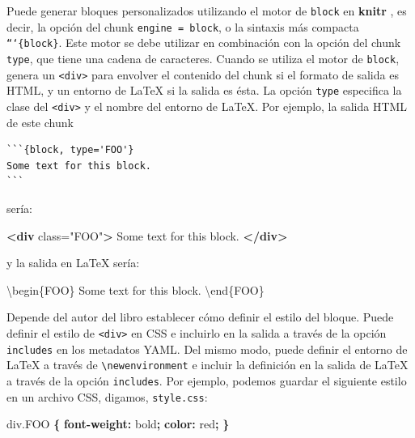 \documentclass[12pt,]{krantz}
\makeatletter
\newenvironment{Shaded}{\begin{snugshade}}{\end{snugshade}}
\newcommand{\KeywordTok}[1]{\textcolor[rgb]{0.13,0.29,0.53}{\textbf{{#1}}}}
\newcommand{\DataTypeTok}[1]{\textcolor[rgb]{0.13,0.29,0.53}{{#1}}}
\newcommand{\FloatTok}[1]{\textcolor[rgb]{0.00,0.00,0.81}{{#1}}}
\newcommand{\StringTok}[1]{\textcolor[rgb]{0.31,0.60,0.02}{{#1}}}
\newcommand{\OtherTok}[1]{\textcolor[rgb]{0.56,0.35,0.01}{{#1}}}
\newcommand{\NormalTok}[1]{{#1}}
\newenvironment{kframe}{%
\medskip{}
\setlength{\fboxsep}{.8em}
 \def\at@end@of@kframe{}%
 \ifinner\ifhmode%
  \def\at@end@of@kframe{\end{minipage}}%
  \begin{minipage}{\columnwidth}%
 \fi\fi%
 \def\FrameCommand##1{\hskip\@totalleftmargin \hskip-\fboxsep
 \colorbox{shadecolor}{##1}\hskip-\fboxsep
     \hskip-\linewidth \hskip-\@totalleftmargin \hskip\columnwidth}%
 \MakeFramed {\advance\hsize-\width
   \@totalleftmargin\z@ \linewidth\hsize
   \@setminipage}}%
 {\par\unskip\endMakeFramed%
 \at@end@of@kframe}
\renewenvironment{Shaded}{\begin{kframe}}{\end{kframe}}
\theoremstyle{definition}
\theoremstyle{definition}
\theoremstyle{remark}
\makeatother
\begin{document}
Puede generar bloques personalizados 
utilizando el motor de \texttt{block} en \textbf{knitr} , es decir, la
opción del chunk
\texttt{engine\ =\ \textquotesingle{}block\textquotesingle{}}, o la
sintaxis más compacta \texttt{```\{block\}}. Este motor se debe utilizar
en combinación con la opción del chunk \texttt{type}, que tiene una
cadena de caracteres. Cuando se utiliza el motor de \texttt{block},
genera un \texttt{\textless{}div\textgreater{}} para envolver el
contenido del chunk si el formato de salida es HTML, y un entorno de
LaTeX si la salida es ésta. La opción \texttt{type} especifica la clase
del \texttt{\textless{}div\textgreater{}} y el nombre del entorno de
LaTeX. Por ejemplo, la salida HTML de este chunk

\begin{verbatim}
```{block, type='FOO'}
Some text for this block.
```
\end{verbatim}

sería:

\begin{Shaded}
\begin{Highlighting}[]
\KeywordTok{<div}\OtherTok{ class=}\StringTok{"FOO"}\KeywordTok{>}
\NormalTok{Some text for this block.}
\KeywordTok{</div>}
\end{Highlighting}
\end{Shaded}

y la salida en LaTeX sería:

\begin{Shaded}
\begin{Highlighting}[]
\NormalTok{\textbackslash{}begin\{FOO\}}
\NormalTok{Some text for this block.}
\NormalTok{\textbackslash{}end\{FOO\}}
\end{Highlighting}
\end{Shaded}

Depende del autor del libro establecer cómo definir el estilo del
bloque. Puede definir el estilo de \texttt{\textless{}div\textgreater{}}
en CSS e incluirlo en la salida a través de la opción \texttt{includes}
en los metadatos YAML. Del mismo modo, puede definir el entorno de LaTeX
a través de \texttt{\textbackslash{}newenvironment} e incluir la
definición en la salida de LaTeX a través de la opción
\texttt{includes}. Por ejemplo, podemos guardar el siguiente estilo en
un archivo CSS, digamos, \texttt{style.css}:

\begin{Shaded}
\begin{Highlighting}[]
\NormalTok{div}\FloatTok{.FOO} \KeywordTok{\{}
  \KeywordTok{font-weight:} \DataTypeTok{bold}\KeywordTok{;}
  \KeywordTok{color:} \DataTypeTok{red}\KeywordTok{;}
\KeywordTok{\}}
\end{Highlighting}
\end{Shaded}
\end{document}
